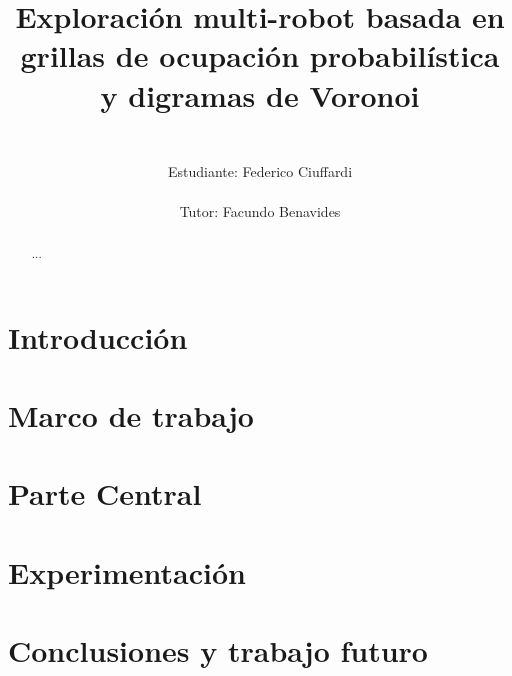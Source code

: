 \documentclass{report}
\title{%
\begin{figure}[H]
\vspace{-2.5cm}
  \subfloat{\hspace{0.075\textwidth}}
  \subfloat{\texttt{[image: logos/udelar.jpg]}}
  \subfloat{\hspace{0.2\textwidth}}
  \subfloat{\texttt{[image: logos/logo-fing.png]}}
  \subfloat{\hspace{0.2\textwidth}}
  \subfloat{\texttt{[image: logos/inco.png]}}
\end{figure}
\vspace{0.25cm}
\huge
Exploración multi-robot basada en grillas de ocupación probabilística y digramas de Voronoi\\
}
\author{%
\Large
\vspace{0.5cm}\\
Estudiante: Federico Ciuffardi\\
\vspace{0.5cm}\\
Tutor: Facundo Benavides%
}
\date{}
\renewcommand\_{\textunderscore\allowbreak}
\begin{document}

\maketitle

\thispagestyle{empty}
\setcounter{page}{1}

\begin{abstract}    %
    ...
\end{abstract}

\hfuzz=10pt 
\tableofcontents
\hfuzz=0pt 

\listoffigures  %
\listoftables   %
\listofalgorithms %

\chapter{Introducción}\label{cha:Intro}


\chapter{Marco de trabajo}\label{cha:marco}
\hfuzz=10pt 
\minitoc
\hfuzz=0pt 



\chapter{Parte Central}\label{cha:central}
\hfuzz=10pt 
\minitoc
\hfuzz=0pt 



\chapter{Experimentación}\label{cha:exp}
\hfuzz=10pt 
\minitoc
\hfuzz=0pt 



\chapter{Conclusiones y trabajo futuro}\label{cha:concl}
\hfuzz=10pt 
\minitoc
\hfuzz=0pt 



\begin{appendices}

\end{appendices}



\end{document}
